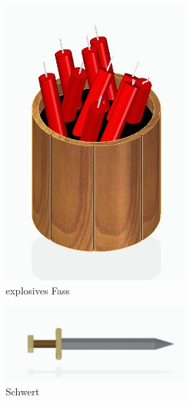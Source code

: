 \documentclass[12pt]{article}
\begin{document}
\begin{figure}
	\centering
	\includegraphics[width=0.6\textwidth]{barrel}
	\caption{explosives Fass
		\label{fig:barrel}}
\end{figure}

\begin{figure}
	\centering
	\includegraphics[width=0.6\textwidth]{Schwert}
	\caption{Schwert
		\label{fig:sword}}
\end{figure}
	
\end{document}
